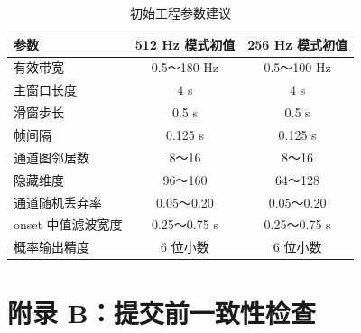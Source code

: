 \begin{table}[htbp]
    \centering
    \small
    \caption{初始工程参数建议}
    \label{tab:initial-params}
    \renewcommand{\arraystretch}{1.25}
    \setlength{\tabcolsep}{5pt}
    \begin{tabular}{@{}lcc@{}}
        \toprule
        \textbf{参数} & \textbf{512 Hz 模式初值} & \textbf{256 Hz 模式初值} \\
        \midrule
        有效带宽 & 0.5～180 Hz & 0.5～100 Hz \\
        主窗口长度 & 4 s & 4 s \\
        滑窗步长 & 0.5 s & 0.5 s \\
        帧间隔 & 0.125 s & 0.125 s \\
        通道图邻居数 & 8～16 & 8～16 \\
        隐藏维度 & 96～160 & 64～128 \\
        通道随机丢弃率 & 0.05～0.20 & 0.05～0.20 \\
        onset 中值滤波宽度 & 0.25～0.75 s & 0.25～0.75 s \\
        概率输出精度 & 6 位小数 & 6 位小数 \\
        \bottomrule
    \end{tabular}
\end{table}

\setcounter{section}{2}
\clearpage
\section*{附录 B：提交前一致性检查}

